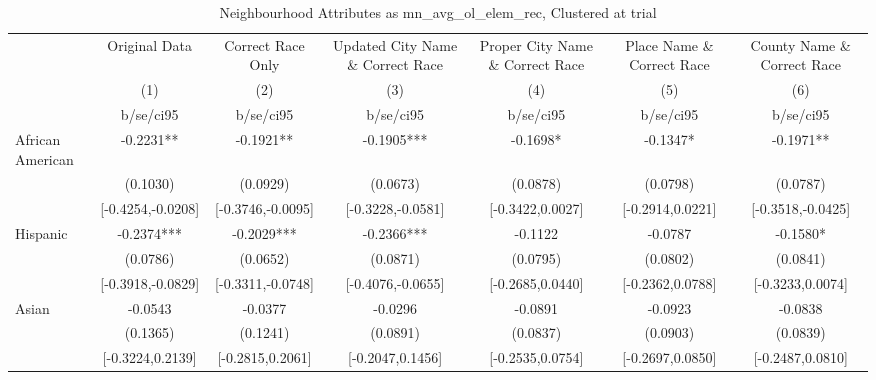 \documentclass{article}
\begin{document}
\begin{table}[htbp]\centering
\def\sym#1{\ifmmode^{#1}\else\(^{#1}\)\fi}
\caption{Neighbourhood Attributes as mn\_avg\_ol\_elem\_rec, Clustered at trial}
\begin{tabular}{l*{6}{c}}
\toprule
                    &\multicolumn{1}{c}{Original Data}&\multicolumn{1}{c}{Correct Race Only}&\multicolumn{1}{c}{Updated City Name \& Correct Race}&\multicolumn{1}{c}{Proper City Name \& Correct Race}&\multicolumn{1}{c}{Place Name \& Correct Race}&\multicolumn{1}{c}{County Name \& Correct Race}\\\cmidrule(lr){2-2}\cmidrule(lr){3-3}\cmidrule(lr){4-4}\cmidrule(lr){5-5}\cmidrule(lr){6-6}\cmidrule(lr){7-7}
                    &\multicolumn{1}{c}{(1)}   &\multicolumn{1}{c}{(2)}   &\multicolumn{1}{c}{(3)}   &\multicolumn{1}{c}{(4)}   &\multicolumn{1}{c}{(5)}   &\multicolumn{1}{c}{(6)}   \\
                    &   b/se/ci95   &   b/se/ci95   &   b/se/ci95   &   b/se/ci95   &   b/se/ci95   &   b/se/ci95   \\
\midrule
African American    &     -0.2231** &     -0.1921** &     -0.1905***&     -0.1698*  &     -0.1347*  &     -0.1971** \\
                    &    (0.1030)   &    (0.0929)   &    (0.0673)   &    (0.0878)   &    (0.0798)   &    (0.0787)   \\
                    &[-0.4254,-0.0208]   &[-0.3746,-0.0095]   &[-0.3228,-0.0581]   &[-0.3422,0.0027]   &[-0.2914,0.0221]   &[-0.3518,-0.0425]   \\
Hispanic            &     -0.2374***&     -0.2029***&     -0.2366***&     -0.1122   &     -0.0787   &     -0.1580*  \\
                    &    (0.0786)   &    (0.0652)   &    (0.0871)   &    (0.0795)   &    (0.0802)   &    (0.0841)   \\
                    &[-0.3918,-0.0829]   &[-0.3311,-0.0748]   &[-0.4076,-0.0655]   &[-0.2685,0.0440]   &[-0.2362,0.0788]   &[-0.3233,0.0074]   \\
Asian               &     -0.0543   &     -0.0377   &     -0.0296   &     -0.0891   &     -0.0923   &     -0.0838   \\
                    &    (0.1365)   &    (0.1241)   &    (0.0891)   &    (0.0837)   &    (0.0903)   &    (0.0839)   \\
                    &[-0.3224,0.2139]   &[-0.2815,0.2061]   &[-0.2047,0.1456]   &[-0.2535,0.0754]   &[-0.2697,0.0850]   &[-0.2487,0.0810]   \\

\end{tabular}
\end{table}
\end{document}
